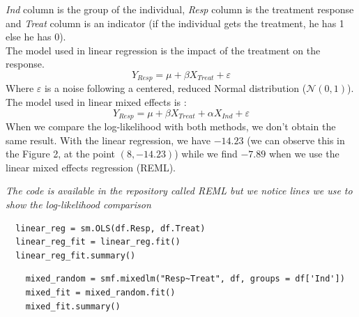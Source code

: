 \documentclass{article}
\begin{document}
\textit{Ind} column is the group of the individual, \textit{Resp} column is the treatment response and \textit{Treat} column is an indicator (if the individual gets the treatment, he has 1 else he has 0).\\
The model used in linear regression is the impact of the treatment on the response.
\begin{equation*}
    Y_{Resp} = \mu +  \beta X_{Treat} + \varepsilon
\end{equation*}
Where $\varepsilon$ is a noise following a centered, reduced Normal distribution ($\mathcal{N}(0, 1)$).\\
The model used in linear mixed effects is :
\begin{equation*}
    Y_{Resp} = \mu + \beta X_{Treat}  + \alpha X_{Ind} +\varepsilon
\end{equation*}
When we compare the log-likelihood with both methods, we don't obtain the same result.
With the linear regression, we have $-14.23$ (we can observe this in the Figure 2, at the point $(8, -14.23)$) while we find $-7.89$ when we use the linear mixed effects regression (REML).\\
\begin{remark}
\textit{The code is available in the repository called REML but we notice lines we use to show the log-likelihood comparison}
\end{remark}
\begin{lstlisting}
  linear_reg = sm.OLS(df.Resp, df.Treat)
  linear_reg_fit = linear_reg.fit()
  linear_reg_fit.summary()
\end{lstlisting}
\begin{lstlisting}
    mixed_random = smf.mixedlm("Resp~Treat", df, groups = df['Ind'])
    mixed_fit = mixed_random.fit()
    mixed_fit.summary() 
\end{lstlisting}
\end{document}
